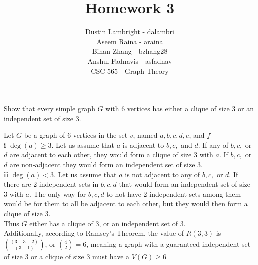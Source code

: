 \documentclass[12pt]{article}
\newenvironment{question}[2][Question]{\begin{trivlist}
\item[\hskip \labelsep {\bfseries #1}\hskip \labelsep {\bfseries #2.}]}{\end{trivlist}}
\begin{document}


\title{Homework 3}%
\author{Dustin Lambright - dalambri \\ Aseem Raina - araina \\ Bihan Zhang - bzhang28 \\ Anshul Fadnavis - asfadnav\\
CSC 565 - Graph Theory} %

\maketitle


\begin{question}{1}
Show that every simple graph $G$ with 6 vertices has either a clique of size 3 or an independent
set of size 3.
\end{question}

Let $G$ be a graph of 6 vertices in the set $v$, named $a, b, c, d, e$, and $f$ \\ 

\textbf{i} $\deg(a) \geq 3$. Let us assume that $a$ is adjacent to $b, c,$ and $d$. If any of $b, c,$ or $d$ are adjacent to each other, they would form a clique of size 3 with $a$. If $b, c,$ or $d$ are non-adjacent they would form an independent set of size 3.\\

\textbf{ii} $\deg(a) < 3$. Let us assume that $a$ is not adjacent to any of $b, c,$ or $d$. If there are 2 independent sets in $b, c, d$ that would form an independent set of size 3 with $a$. The only way for $b,c,d$ to not have 2 independent sets among them would be for them to all be adjacent to each other, but they would then form a clique of size 3.\\

Thus $G$ either has a clique of 3, or an independent set of 3.  \\

Additionally, according to Ramsey's Theorem, the value of $R(3,3)$ is ${(3+3-2) \choose (3-1)}$, or ${4 \choose 2} = 6$, meaning a graph with a guaranteed independent set of size 3 or a clique of size 3 must have a $V(G) \geq 6$ \\
\end{document}
